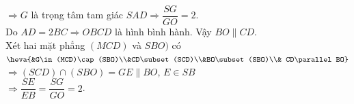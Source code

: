 \begin{bt}
\begin{bt}
{\begin{enumerate}
        $\Rightarrow G$ là trọng tâm tam giác $SAD \Rightarrow \dfrac{SG}{GO}=2.$\\
        Do $AD=2BC\Rightarrow OBCD$ là hình bình hành. Vậy $BO\parallel CD$.\\
        Xét hai mặt phẳng $(MCD)$ và $SBO)$ có\\
        $\heva{&G\in (MCD)\cap (SBO)\\&CD\subset (SCD)\\&BO\subset (SBO)\\& CD\parallel BO}$\\
        $\Rightarrow (SCD)\cap (SBO)=GE\parallel BO$, $E\in SB$\\
        $\Rightarrow \dfrac{SE}{EB}=\dfrac{SG}{GO}=2$.
        \end{enumerate}	
	}
\end{bt}


\end{bt}
